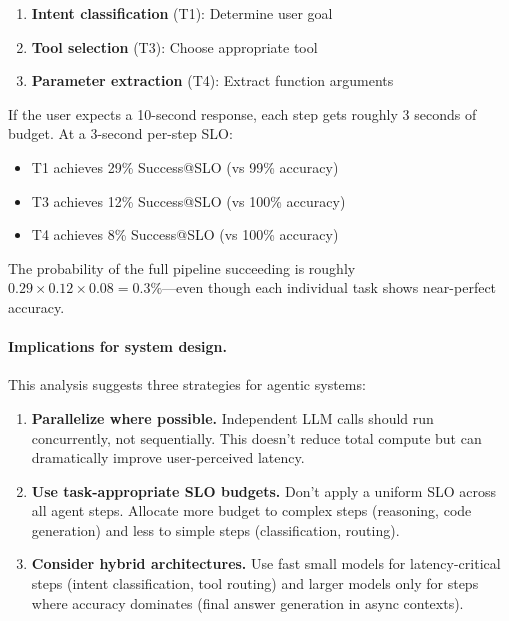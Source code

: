 \documentclass[11pt]{article}
\begin{document}
\begin{enumerate}[leftmargin=12pt]
    \item \textbf{Intent classification} (T1): Determine user goal
    \item \textbf{Tool selection} (T3): Choose appropriate tool
    \item \textbf{Parameter extraction} (T4): Extract function arguments
\end{enumerate}

If the user expects a 10-second response, each step gets roughly 3 seconds of budget.
At a 3-second per-step SLO:
\begin{itemize}[leftmargin=12pt]
    \item T1 achieves 29\% Success@SLO (vs 99\% accuracy)
    \item T3 achieves 12\% Success@SLO (vs 100\% accuracy)
    \item T4 achieves 8\% Success@SLO (vs 100\% accuracy)
\end{itemize}

The probability of the full pipeline succeeding is roughly $0.29 \times 0.12 \times 0.08 = 0.3\%$---even though each individual task shows near-perfect accuracy.

\paragraph{Implications for system design.}
This analysis suggests three strategies for agentic systems:

\begin{enumerate}[leftmargin=12pt]
    \item \textbf{Parallelize where possible.} Independent LLM calls should run concurrently, not sequentially. This doesn't reduce total compute but can dramatically improve user-perceived latency.

    \item \textbf{Use task-appropriate SLO budgets.} Don't apply a uniform SLO across all agent steps. Allocate more budget to complex steps (reasoning, code generation) and less to simple steps (classification, routing).

    \item \textbf{Consider hybrid architectures.} Use fast small models for latency-critical steps (intent classification, tool routing) and larger models only for steps where accuracy dominates (final answer generation in async contexts).
\end{enumerate}
\end{document}
